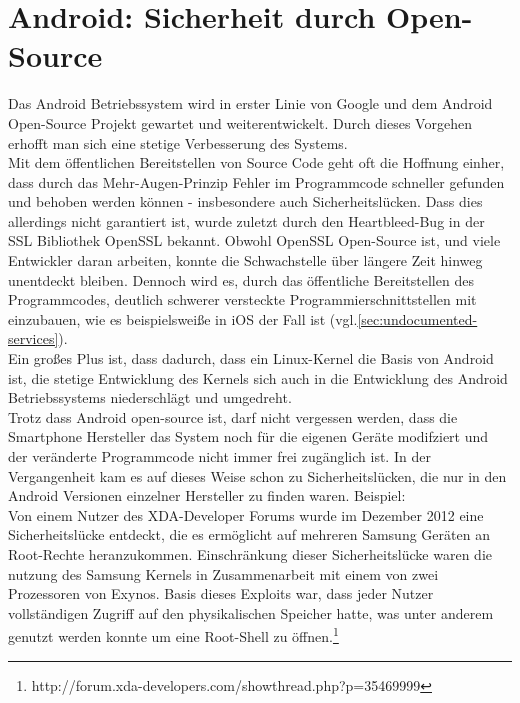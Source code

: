 \section{Android: Sicherheit durch Open-Source} \label{sec:Android_Sicherheit_Open_Source}
Das Android Betriebssystem wird in erster Linie von Google und dem Android Open-Source Projekt gewartet und weiterentwickelt. Durch dieses Vorgehen erhofft man sich eine stetige Verbesserung des Systems. \\
Mit dem öffentlichen Bereitstellen von Source Code geht oft die Hoffnung einher, dass durch das Mehr-Augen-Prinzip Fehler im Programmcode schneller gefunden und behoben werden können - insbesondere auch Sicherheitslücken.
Dass dies allerdings nicht garantiert ist, wurde zuletzt durch den Heartbleed-Bug in der SSL Bibliothek OpenSSL bekannt. Obwohl OpenSSL Open-Source ist, und viele Entwickler daran arbeiten, konnte die Schwachstelle über längere Zeit hinweg unentdeckt bleiben. Dennoch wird es, durch das öffentliche Bereitstellen des Programmcodes, deutlich schwerer versteckte Programmierschnittstellen mit einzubauen, wie es beispielsweiße in iOS der Fall ist (vgl.\ref{sec:undocumented-services}).\\
Ein großes Plus ist, dass dadurch, dass ein Linux-Kernel die Basis von Android ist, die stetige Entwicklung des Kernels sich auch in die Entwicklung des Android Betriebssystems niederschlägt und umgedreht.\\
Trotz dass Android open-source ist, darf nicht vergessen werden, dass die Smartphone Hersteller das System noch für die eigenen Geräte modifziert und der veränderte Programmcode nicht immer frei zugänglich ist. In der Vergangenheit kam es auf dieses Weise schon zu Sicherheitslücken, die nur in den Android Versionen einzelner Hersteller zu finden waren. Beispiel:\\
Von einem Nutzer des XDA-Developer Forums wurde im Dezember 2012 eine Sicherheitslücke entdeckt, die es ermöglicht auf mehreren Samsung Geräten an Root-Rechte heranzukommen. Einschränkung dieser Sicherheitslücke waren die nutzung des Samsung Kernels in Zusammenarbeit mit einem von zwei Prozessoren von Exynos. Basis dieses Exploits war, dass jeder Nutzer vollständigen Zugriff auf den physikalischen Speicher hatte, was unter anderem genutzt werden konnte um eine Root-Shell zu öffnen.\footnote{http://forum.xda-developers.com/showthread.php?p=35469999} \\

